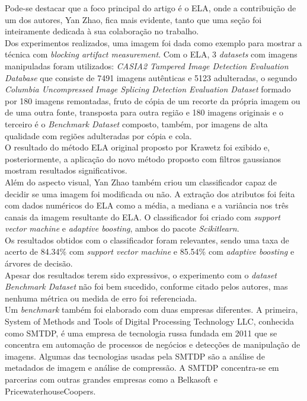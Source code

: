 \begin{enumerate}
\begin{enumerate}[label*=\arabic*.]
Pode-se destacar que a foco principal do artigo é o ELA, onde a contribuição de um dos autores, Yan Zhao, fica mais evidente, tanto que uma seção foi inteiramente dedicada à sua colaboração no trabalho.
\\[6pt]
Dos experimentos realizados, uma imagem foi dada como exemplo para mostrar a técnica com \textit{blocking artifact measurement}. Com o ELA, 3 \textit{datasets} com imagens manipuladas foram utilizados: \textit{CASIA2 Tampered Image Detection Evaluation Database} que consiste de 7491 imagens autênticas e 5123 adulteradas, o segundo \textit{Columbia Uncompressed Image Splicing Detection Evaluation Dataset} formado por 180 imagens remontadas, fruto de cópia de um recorte da própria imagem ou de uma outra fonte, transposta para outra região e 180 imagens originais e o terceiro é o \textit{Benchmark Dataset} composto, também, por imagens de alta qualidade com regiões adulteradas por cópia e cola.
\\[6pt]
O resultado do método ELA original proposto por Krawetz \cite{krawetz} foi exibido e, posteriormente, a aplicação do novo método proposto com filtros gaussianos mostram resultados significativos.
\\[6pt]
Além do aspecto visual, Yan Zhao também criou um classificador capaz de decidir se uma imagem foi modificada ou não. A extração dos atributos foi feita com dados numéricos do ELA como a média, a mediana e a variância nos três canais da imagem resultante do ELA. O classificador foi criado com \textit{support vector machine} e \textit{adaptive boosting}, ambos do pacote \textit{Scikitlearn}.
\\[6pt]
Os resultados obtidos com o classificador foram relevantes, sendo uma taxa de acerto de 84.34\% com \textit{support vector machine} e 85.54\% com \textit{adaptive boosting} e árvores de decisão.
\\[6pt]
Apesar dos resultados terem sido expressivos, o experimento com o \textit{dataset} \textit{Benchmark Dataset} não foi bem sucedido, conforme citado pelos autores, mas nenhuma métrica ou medida de erro foi referenciada.
\\[6pt]
Um \textit{benchmark} também foi elaborado com duas empresas diferentes. A primeira, System of Methods and Tools of Digital Processing Technology LLC, conhecida como SMTDP, é uma empresa de tecnologia russa fundada em 2011 que se concentra em automação de processos de negócios e detecções de manipulação de imagens. Algumas das tecnologias usadas pela SMTDP são a análise de metadados de imagem e análise de compressão. A SMTDP concentra-se em parcerias com outras grandes empresas como a Belkasoft e PricewaterhouseCoopers.

\end{enumerate}
\end{enumerate}
